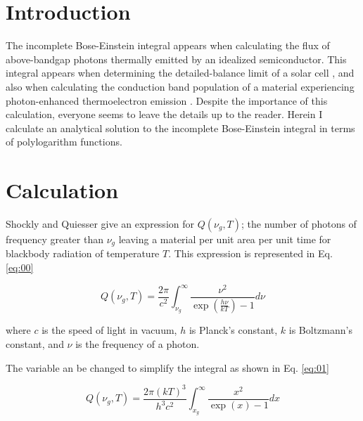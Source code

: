\documentclass[letterpaper,12pt]{article}
\title{\Title}
\author{\AuthorName}
\begin{document}
\maketitle


\begin{abstract}

\end{abstract}


\section{Introduction}
The incomplete Bose-Einstein integral appears when calculating the flux of above-bandgap photons thermally emitted by an idealized semiconductor. This integral appears when determining the detailed-balance limit of a solar cell \cite{10.1063/1.1736034}, and also when calculating the conduction band population of a material experiencing photon-enhanced thermoelectron emission \cite{10.1038/nmat2814}. Despite the importance of this calculation, everyone seems to leave the details up to the reader. Herein I calculate an analytical solution to the incomplete Bose-Einstein integral in terms of polylogarithm functions.

\section{Calculation}
Shockly and Quiesser \cite{10.1063/1.1736034} give an expression for $Q(\nu_{g}, T)$; the number of photons of frequency greater than $\nu_{g}$ leaving a material per unit area per unit time for blackbody radiation of temperature $T$. This expression is represented in Eq. \ref{eq:00}

\begin{equation} \label{eq:00}
Q(\nu_{g}, T) = \frac{2\pi}{c^{2}} \int_{\nu_{g}}^{\infty} \frac{\nu^{2}}{\exp\left( \frac{h \nu}{kT} \right) - 1} d\nu
\end{equation}

\noindent where $c$ is the speed of light in vacuum, $h$ is Planck's constant, $k$ is Boltzmann's constant, and $\nu$ is the frequency of a photon.

The variable an be changed to simplify the integral as shown in Eq. \ref{eq:01}

\begin{equation} \label{eq:01}
Q(\nu_{g}, T) = \frac{2\pi (kT)^{3}}{h^{3} c^{2}} \int_{x_{g}}^{\infty} \frac{x^{2}}{\exp(x) - 1} dx
\end{equation}
\end{document}
